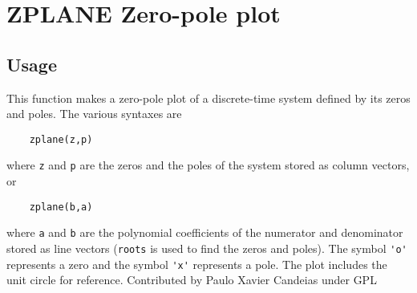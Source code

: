 \section{ZPLANE Zero-pole plot}

\subsection{Usage}

 This function makes a zero-pole plot of a discrete-time
 system defined by its zeros and poles. The various syntaxes
 are
\begin{verbatim}
    zplane(z,p)
\end{verbatim}
 where \verb|z| and \verb|p| are the zeros and the poles of the system
 stored as column vectors, or
\begin{verbatim}
    zplane(b,a)
\end{verbatim}
 where \verb|a| and \verb|b| are the polynomial coefficients of the
 numerator and denominator stored as line vectors (\verb|roots| is
 used to find the zeros and poles). The symbol \verb|'o'| represents
 a zero and the symbol \verb|'x'| represents a pole. The plot includes
 the unit circle for reference.
Contributed by Paulo Xavier Candeias under GPL
